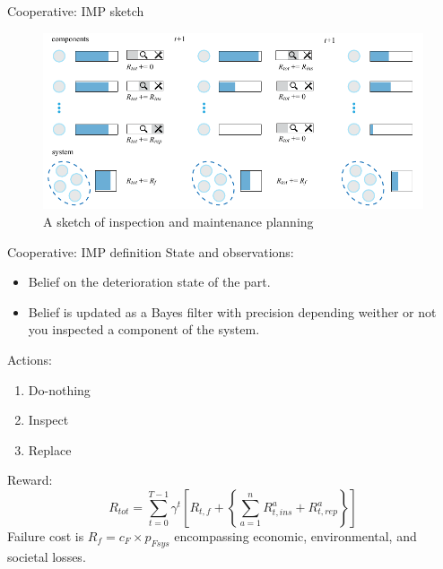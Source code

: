 \documentclass[9pt, hyperref={pdfusetitle,colorlinks=true,allcolors=DarkBlue}]{beamer}
\begin{document}
\begin{frame}{Cooperative: IMP sketch}
    \begin{figure}
        \centering
        \includegraphics[width=\textwidth]{oimp_intro.pdf}
        \caption{A sketch of inspection and maintenance planning}
    \end{figure}
\end{frame}


\begin{frame}{Cooperative: IMP definition}
State and observations:
\begin{itemize}
    \item Belief on the deterioration state of the part.
    \item Belief is updated as a Bayes filter with precision depending weither or not you inspected a component of the system. 
\end{itemize}
Actions: 
\begin{enumerate}
    \item Do-nothing
    \item Inspect
    \item Replace
\end{enumerate}
Reward:
\begin{equation}
    R_{tot} = \sum_{t=0}^{T-1} \gamma^t \left[ R_{t,f}+ \left\{ \sum_{a=1}^n {R_{t,ins}^a} + {R_{t,rep}^a}\right\} \right]
    \label{eq:totalcost}
\end{equation}
Failure cost is $R_f = c_F \times p_{Fsys}$ encompassing economic, environmental, and societal losses.
\end{frame}
\end{document}
